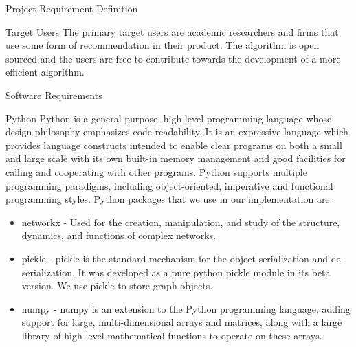 \documentclass{report}
\begin{document}
\begin{projChapter}{Project Requirement Definition}
\begin{projSection}{Target Users}
            The primary target users are academic researchers and firms that use some form of recommendation in their product. The algorithm is open sourced and the users are free to contribute towards the development of a more efficient algorithm.
        \end{projSection}
\begin{projSection}{Software Requirements}
\begin{projSubSection}{Python}
                Python is a general-purpose, high-level programming language whose design philosophy emphasizes code readability. It is an expressive language which provides language constructs intended to enable clear programs on both a small and large scale with its own built-in memory management and good facilities for calling and cooperating with other programs. Python supports multiple programming paradigms, including object-oriented, imperative and functional programming styles. Python packages that we use in our implementation are:
                
\begin{itemize}
  \item networkx - Used for the creation, manipulation, and study of the structure, dynamics, and functions of complex networks.
  \item pickle - pickle is the standard mechanism for the object serialization and de-serialization. It was developed as a pure python pickle module in its beta version.  We use pickle to store graph objects.
  \item numpy -  numpy is an extension to the Python programming language, adding support for large, multi-dimensional arrays and matrices, along with a large library of high-level mathematical functions to operate on these arrays.
\end{itemize}


\end{projSubSection}
\end{projSection}
\end{projChapter}
\end{document}

